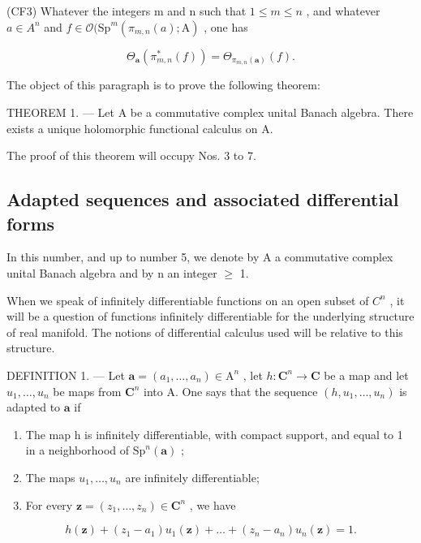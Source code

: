 (CF3) Whatever the integers m and n such that \(1 \leqslant m \leqslant n\) , and whatever \(a \in A^{n}\) and \(f \in \mathcal{O}(\mathrm{Sp}^{m}(\pi_{m,n}(a); \mathrm{A})\) , one has

\[
\Theta_ {\boldsymbol {a}} (\pi_ {m, n} ^ {*} (f)) = \Theta_ {\pi_ {m, n} (\boldsymbol {a})} (f).
\]

The object of this paragraph is to prove the following theorem:

THEOREM 1. --- Let A be a commutative complex unital Banach algebra. There exists a unique holomorphic functional calculus on A.

The proof of this theorem will occupy Nos. 3 to 7.

\subsection{Adapted sequences and associated differential forms}

In this number, and up to number 5, we denote by A a commutative complex unital Banach algebra and by n an integer \(\geqslant\) 1.

When we speak of infinitely differentiable functions on an open subset of \(C^{n}\) , it will be a question of functions infinitely differentiable for the underlying structure of real manifold. The notions of differential calculus used will be relative to this structure.

DEFINITION 1. --- Let \(\boldsymbol{a} = (a_{1},\ldots ,a_{n})\in \mathrm{A}^{n}\) , let \(h\colon \mathbf{C}^n\to \mathbf{C}\) be a map and let \(u_{1},\ldots ,u_{n}\) be maps from \(\mathbf{C}^n\) into A. One says that the sequence \((h,u_1,\dots ,u_n)\) is adapted to \(\boldsymbol{a}\) if

\begin{enumerate}
\def\labelenumi{(\roman{enumi})}
\item
  The map h is infinitely differentiable, with compact support, and equal to 1 in a neighborhood of \(\mathrm{Sp}^n (\boldsymbol {a})\) ;
\item
  The maps \(u_1, \ldots, u_n\) are infinitely differentiable;
\item
  For every \(\boldsymbol{z} = (z_{1},\dots ,z_{n})\in \mathbf{C}^{n}\) , we have
\end{enumerate}

\[
h (\boldsymbol {z}) + (z _ {1} - a _ {1}) u _ {1} (\boldsymbol {z}) + \dots + (z _ {n} - a _ {n}) u _ {n} (\boldsymbol {z}) = 1.\tag{1}
\]

